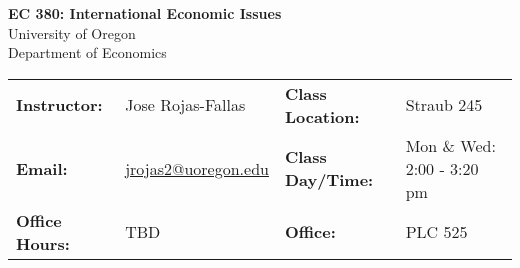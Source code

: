 \begin{center}
\textbf{\huge EC 380: International Economic Issues}\\ 
\vspace{0.1in}
University of Oregon\\ 
Department of Economics\\ 
\end{center}
\vspace{-.2in}
\begin{center}\begin{tabular}{llll}
\toprule
    \textbf{Instructor:} & \footnotesize{Jose Rojas-Fallas} & \textbf{Class Location:}  & {\footnotesize Straub 245} \\ 
    \textbf{Email:} & \footnotesize{\href{mailto:jrojas2@uoregon.edu}{jrojas2@uoregon.edu}} & \textbf{Class Day/Time:} & \footnotesize{Mon \& Wed: 2:00 - 3:20 pm} \\
    \textbf{Office Hours:} & \footnotesize{TBD} & \textbf{Office:} & \footnotesize{PLC 525}\\
\bottomrule
\end{tabular}
\end{center}
